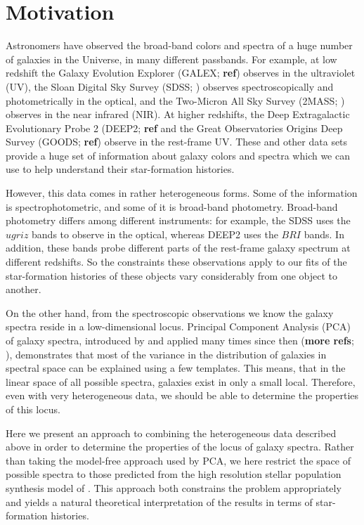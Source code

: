 \documentclass[10pt]{aastex}
\begin{document}
\section{Motivation}
\label{motivation}

Astronomers have observed the broad-band colors and spectra of a huge
number of galaxies in the Universe, in many different passbands.  For
example, at low redshift the Galaxy Evolution Explorer (GALEX; {\bf
ref}) observes in the ultraviolet (UV), the Sloan Digital Sky Survey
(SDSS; \citealt{york00a}) observes spectroscopically and
photometrically in the optical, and the Two-Micron All Sky Survey
(2MASS; \citealt{strutskie97a}) observes in the near infrared
(NIR). At higher redshifts, the Deep Extragalactic Evolutionary Probe
2 (DEEP2; {\bf ref} and the Great Observatories Origins Deep Survey
(GOODS; {\bf ref}) observe in the rest-frame UV. These and other data
sets provide a huge set of information about galaxy colors and spectra
which we can use to help understand their star-formation histories.

However, this data comes in rather heterogeneous forms. Some of the
information is spectrophotometric, and some of it is broad-band
photometry. Broad-band photometry differs among different instruments:
for example, the SDSS uses the $ugriz$ bands to observe in the
optical, whereas DEEP2 uses the $BRI$ bands. In addition, these bands
probe different parts of the rest-frame galaxy spectrum at different
redshifts. So the constraints these observations apply to our fits of
the star-formation histories of these objects vary considerably from
one object to another.

On the other hand, from the spectroscopic observations we know the
galaxy spectra reside in a low-dimensional locus. Principal Component
Analysis (PCA) of galaxy spectra, introduced by \citet{connolly94a} and
applied many times since then ({\bf more refs}; \citealt{yip05a}),
demonstrates that most of the variance in the distribution of galaxies
in spectral space can be explained using a few templates. This means,
that in the linear space of all possible spectra, galaxies exist in
only a small local. Therefore, even with very heterogeneous data, we
should be able to determine the properties of this locus.

Here we present an approach to combining the heterogeneous data
described above in order to determine the properties of the locus of
galaxy spectra. Rather than taking the model-free approach used by
PCA, we here restrict the space of possible spectra to those predicted
from the high resolution stellar population synthesis model of
\citet{bruzual03a}. This approach both constrains the problem
appropriately and yields a natural theoretical interpretation of the
results in terms of star-formation histories.
\end{document}
